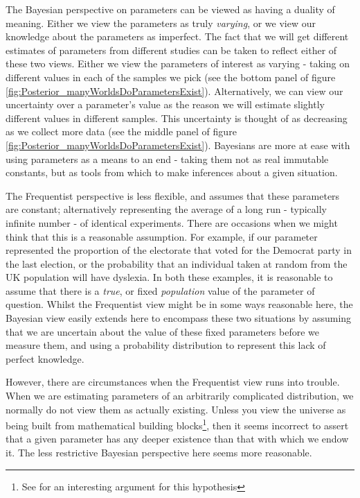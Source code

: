 \documentclass[11pt,fullpage]{book}
\begin{document}
The Bayesian perspective on parameters can be viewed as having a duality of meaning. Either we view the parameters as truly \textit{varying}, or we view our knowledge about the parameters as imperfect. The fact that we will get different estimates of parameters from different studies can be taken to reflect either of these two views. Either we view the parameters of interest as varying - taking on different values in each of the samples we pick (see the bottom panel of figure \ref{fig:Posterior_manyWorldsDoParametersExist}). Alternatively, we can view our uncertainty over a parameter's value as the reason we will estimate slightly different values in different samples. This uncertainty is thought of as decreasing as we collect more data (see the middle panel of figure \ref{fig:Posterior_manyWorldsDoParametersExist}). Bayesians are more at ease with using parameters as a means to an end - taking them not as real immutable constants, but as tools from which to make inferences about a given situation.

The Frequentist perspective is less flexible, and assumes that these parameters are constant; alternatively representing the average of a long run - typically infinite number - of identical experiments. There are occasions when we might think that this is a reasonable assumption. For example, if our parameter represented the proportion of the electorate that voted for the Democrat party in the last election, or the probability that an individual taken at random from the UK population will have dyslexia. In both these examples, it is reasonable to assume that there is a \textit{true}, or fixed \textit{population} value of the parameter of question. Whilst the Frequentist view might be in some ways reasonable here, the Bayesian view easily extends here to encompass these two situations by assuming that we are uncertain about the value of these fixed parameters before we measure them, and using a probability distribution to represent this lack of perfect knowledge. 

However, there are circumstances when the Frequentist view runs into trouble. When we are estimating parameters of an arbitrarily complicated distribution, we normally do not view them as actually existing. Unless you view the universe as being built from mathematical building blocks\footnote{See \cite{tegmark2014our} for an interesting argument for this hypothesis}, then it seems incorrect to assert that a given parameter has any deeper existence than that with which we endow it. The less restrictive Bayesian perspective here seems more reasonable.
\end{document}

